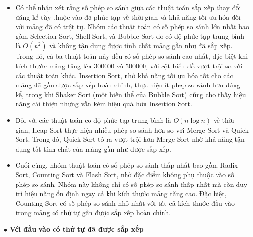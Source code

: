 \begin{itemize}[label=$\circ$]
    \item Có thể nhận xét rằng số phép so sánh giữa các thuật toán sắp 
    xếp thay đổi đáng kể tùy thuộc vào độ phức tạp về thời gian và khả 
    năng tối ưu hóa đối với mảng đã có trật tự. Nhóm các thuật toán có 
    số phép so sánh lớn nhất bao gồm Selection Sort, Shell Sort, và 
    Bubble Sort do có độ phức tạp trung bình là $O\left(n^2\right)$ và 
    không tận dụng được tính chất mảng gần như đã sắp xếp. Trong đó, cả 
    ba thuật toán này đều có số phép so sánh cao nhất, đặc biệt khi kích 
    thước mảng tăng lên 300000 và 500000, với cột biểu đồ vượt trội so với 
    các thuật toán khác. Insertion Sort, nhờ khả năng tối ưu hóa tốt cho 
    các mảng đã gần được sắp xếp hoàn chỉnh, thực hiện ít phép so sánh 
    hơn đáng kể, trong khi Shaker Sort (một biến thể của Bubble Sort) cũng 
    cho thấy hiệu năng cải thiện nhưng vẫn kém hiệu quả hơn Insertion Sort. 
	\item Đối với các thuật toán có độ phức tạp trung bình là $O\left(n\log{n}\right)$ 
    về thời gian, Heap Sort thực hiện nhiều phép so sánh hơn so với Merge 
    Sort và Quick Sort. Trong đó, Quick Sort tỏ ra vượt trội hơn Merge 
    Sort nhờ khả năng tận dụng tốt tính chất của mảng gần như được sắp xếp. 
	\item Cuối cùng, nhóm thuật toán có số phép so sánh thấp nhất bao 
    gồm Radix Sort, Counting Sort và Flash Sort, nhờ đặc điểm không phụ 
    thuộc vào số phép so sánh. Nhóm này không chỉ có số phép so sánh thấp 
    nhất mà còn duy trì hiệu năng ổn định ngay cả khi kích thước mảng tăng 
    cao. Đặc biệt, Counting Sort có số phép so sánh nhỏ nhất với tất cả 
    kích thước đầu vào trong mảng có thứ tự gần được sắp xếp hoàn chỉnh.
\end{itemize}

$\bullet$ \textbf{Với đầu vào có thứ tự đã được sắp xếp}

